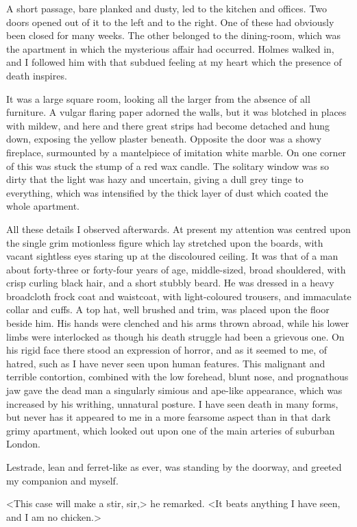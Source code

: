 A short passage, bare planked and dusty, led to the kitchen and offices. Two doors opened out of it to the left and to the right. One of these had obviously been closed for many weeks. The other belonged to the dining-room, which was the apartment in which the mysterious affair had occurred. Holmes walked in, and I followed him with that subdued feeling at my heart which the presence of death inspires.

It was a large square room, looking all the larger from the absence of all furniture. A vulgar flaring paper adorned the walls, but it was blotched in places with mildew, and here and there great strips had become detached and hung down, exposing the yellow plaster beneath. Opposite the door was a showy fireplace, surmounted by a mantelpiece of imitation white marble. On one corner of this was stuck the stump of a red wax candle. The solitary window was so dirty that the light was hazy and uncertain, giving a dull grey tinge to everything, which was intensified by the thick layer of dust which coated the whole apartment.

All these details I observed afterwards. At present my attention was centred upon the single grim motionless figure which lay stretched upon the boards, with vacant sightless eyes staring up at the discoloured ceiling. It was that of a man about forty-three or forty-four years of age, middle-sized, broad shouldered, with crisp curling black hair, and a short stubbly beard. He was dressed in a heavy broadcloth frock coat and waistcoat, with light-coloured trousers, and immaculate collar and cuffs. A top hat, well brushed and trim, was placed upon the floor beside him. His hands were clenched and his arms thrown abroad, while his lower limbs were interlocked as though his death struggle had been a grievous one. On his rigid face there stood an expression of horror, and as it seemed to me, of hatred, such as I have never seen upon human features. This malignant and terrible contortion, combined with the low forehead, blunt nose, and prognathous jaw gave the dead man a singularly simious and ape-like appearance, which was increased by his writhing, unnatural posture. I have seen death in many forms, but never has it appeared to me in a more fearsome aspect than in that dark grimy apartment, which looked out upon one of the main arteries of suburban London.

Lestrade, lean and ferret-like as ever, was standing by the doorway, and greeted my companion and myself.

<This case will make a stir, sir,> he remarked. <It beats anything I have seen, and I am no chicken.>

